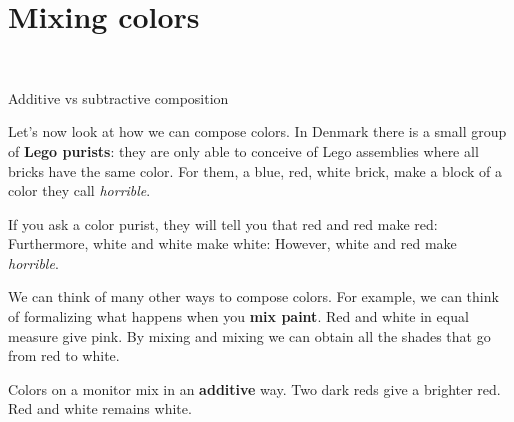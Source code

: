 

\section{Mixing colors}

\begin{marginfigure}
    \centering
    \\
    \caption{Additive vs subtractive composition}
\end{marginfigure}



Let's now look at how we can compose colors.
In Denmark there is a small group of \textbf{Lego purists}: they are only able to conceive of Lego assemblies where all bricks have the same color.
For them, a blue, red, white brick, make a block of a color they call \emph{horrible}.

If you ask a color purist, they will tell you that red and red make red:
%
%
Furthermore, white and white make white:
%
%
However, white and red make \emph{horrible}.
%



We can think of many other ways to compose colors.
For example, we can think of formalizing what happens when you \textbf{mix paint}.
Red and white in equal measure give pink.
By mixing and mixing we can obtain all the shades that go from red to white.


Colors on a monitor mix in an \textbf{additive} way. Two dark reds give a brighter red.
Red and white remains white.

